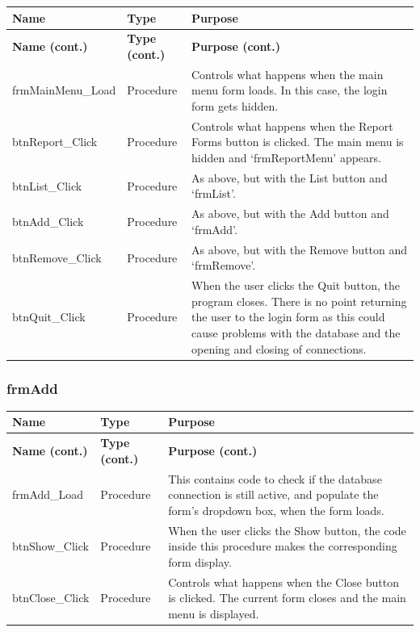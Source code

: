 	\begin{longtable}{ | p{4cm} | p{3cm} | p{10cm} | }
		\hline
		\textbf{Name} & \textbf{Type} & \textbf{Purpose}\\
		\endfirsthead
		\hline
		\textbf{Name (cont.)} & \textbf{Type (cont.)} & \textbf{Purpose (cont.)}\\
		\endhead
		\hline
		frmMainMenu\_Load & Procedure & Controls what happens when the main menu form loads.  In this case, the login form gets hidden.\\
		\hline
		btnReport\_Click & Procedure & Controls what happens when the Report Forms button is clicked.  The main menu is hidden and `frmReportMenu' appears.\\
		\hline
		btnList\_Click & Procedure & As above, but with the List button and `frmList'.\\
		\hline
		btnAdd\_Click & Procedure & As above, but with the Add button and `frmAdd'.\\
		\hline
		btnRemove\_Click & Procedure & As above, but with the Remove button and `frmRemove'.\\
		\hline
		btnQuit\_Click & Procedure & When the user clicks the Quit button, the program closes.  There is no point returning the user to the login form as this could cause problems with the database and the opening and closing of connections.\\
		\hline
	\end{longtable}
	
	\subsubsection{frmAdd}
	
	\begin{longtable}{ | p{4cm} | p{3cm} | p{10cm} | }
		\hline
		\textbf{Name} & \textbf{Type} & \textbf{Purpose}\\
		\endfirsthead
		\hline
		\textbf{Name (cont.)} & \textbf{Type (cont.)} & \textbf{Purpose (cont.)}\\
		\endhead
		\hline
		frmAdd\_Load & Procedure & This contains code to check if the database connection is still active, and populate the form's dropdown box, when the form loads.\\
		\hline
		btnShow\_Click & Procedure & When the user clicks the Show button, the code inside this procedure makes the corresponding form display.\\
		\hline
		btnClose\_Click & Procedure & Controls what happens when the Close button is clicked.  The current form closes and the main menu is displayed.\\
		\hline
	\end{longtable}

